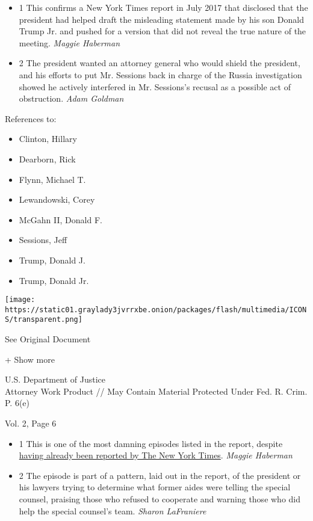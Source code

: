 \begin{itemize}
\tightlist
\item
  1 This confirms a New York Times report in July 2017 that disclosed
  that the president had helped draft the misleading statement made by
  his son Donald Trump Jr. and pushed for a version that did not reveal
  the true nature of the meeting. \emph{Maggie Haberman}
\item
  2 The president wanted an attorney general who would shield the
  president, and his efforts to put Mr. Sessions back in charge of the
  Russia investigation showed he actively interfered in Mr. Sessions's
  recusal as a possible act of obstruction. \emph{Adam Goldman}
\end{itemize}

References to:

\begin{itemize}
\tightlist
\item
  Clinton, Hillary
\item
  Dearborn, Rick
\item
  Flynn, Michael T.
\item
  Lewandowski, Corey
\item
  McGahn II, Donald F.
\item
  Sessions, Jeff
\item
  Trump, Donald J.
\item
  Trump, Donald Jr.
\end{itemize}

\protect\hyperlink{}{}

\texttt{[image: https://static01.graylady3jvrrxbe.onion/packages/flash/multimedia/ICONS/transparent.png]}

See Original Document

+ Show more

U.S. Department of Justice\\
Attorney Work Product // May Contain Material Protected Under Fed. R.
Crim. P. 6(e)

Vol. 2, Page 6

\begin{itemize}
\tightlist
\item
  1 This is one of the most damning episodes listed in the report,
  despite
  \href{https://www.nytimes3xbfgragh.onion/2018/01/25/us/politics/trump-mueller-special-counsel-russia.html?module=inline}{having
  already been reported by The New York Times}. \emph{Maggie Haberman}
\item
  2 The episode is part of a pattern, laid out in the report, of the
  president or his lawyers trying to determine what former aides were
  telling the special counsel, praising those who refused to cooperate
  and warning those who did help the special counsel's team.
  \emph{Sharon LaFraniere}
\end{itemize}

